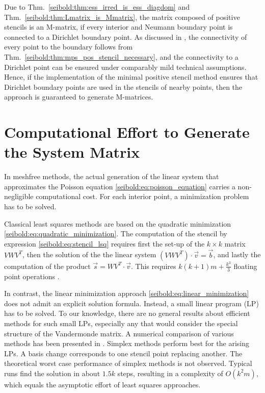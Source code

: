 \documentclass[reqno]{amsart}
\theoremstyle{plain}
\theoremstyle{definition}
\theoremstyle{remark}
\begin{document}
Due to Thm.~\ref{seibold:thm:ess_irred_is_ess_diagdom} and
Thm.~\ref{seibold:thm:Lmatrix_is_Mmatrix}, the matrix composed of positive stencils is
an M-matrix, if every interior and Neumann boundary point is connected to a Dirichlet
boundary point. As discussed in \cite{Seibold2008}, the connectivity of every point to
the boundary follows from Thm.~\ref{seibold:thm:mps_pos_stencil_necessary}, and the
connectivity to a Dirichlet point can be ensured under comparably mild technical
assumptions. Hence, if the implementation of the minimal positive stencil method ensures
that Dirichlet boundary points are used in the stencils of nearby points, then the
approach is guaranteed to generate M-matrices.

\section{Computational Effort to Generate the System Matrix}
\label{seibold:sec:effort_generation}
In meshfree methods, the actual generation of the linear system that approximates the
Poisson equation \eqref{seibold:eq:poisson_equation} carries a non-negligible
computational cost. For each interior point, a minimization problem has to be solved.

Classical least squares methods are based on the quadratic minimization
\eqref{seibold:eq:quadratic_minimization}.
The computation of the stencil by expression \eqref{seibold:eq:stencil_lsq}
requires first the set-up of the $k\times k$ matrix $VWV^T$, then the solution of the
the linear system $(VWV^T)\cdot\vec{v}=\vec{b}$, and lastly the computation of the
product $\vec{s} = WV^T\cdot\vec{v}$. This requires $k(k+1)m+\frac{k^3}{3}$ floating
point operations \cite[p.~150]{SeiboldDiss2006}.

In contrast, the linear minimization approach \eqref{seibold:eq:linear_minimization}
does not admit an explicit solution formula. Instead, a small linear program (LP) has
to be solved. To our knowledge, there are no general results about efficient methods
for such small LPs, especially any that would consider the special structure of the
Vandermonde matrix. A numerical comparison of various methods has been presented
in \cite[p.~148]{SeiboldDiss2006}. Simplex methods \cite{Chvatal1983} perform best for
the arising LPs. A basis change corresponds to one stencil point replacing another.
The theoretical worst case performance of simplex methods is not observed. Typical runs
find the solution in about $1.5 k$ steps, resulting in a complexity of $O(k^2m)$, which
equals the asymptotic effort of least squares approaches.
\end{document}
